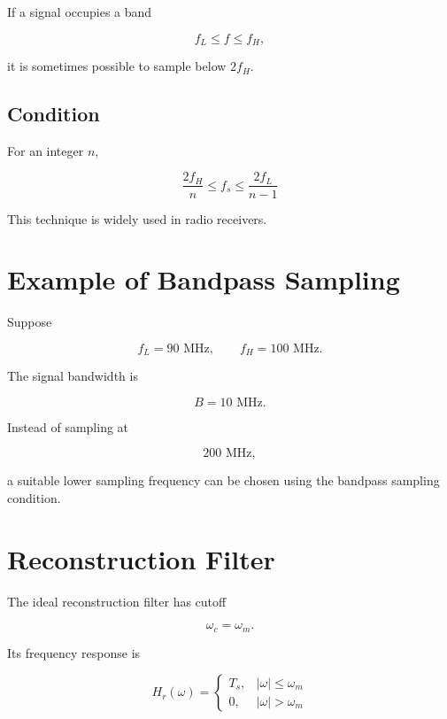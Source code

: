 If a signal occupies a band

\[
f_L\le f\le f_H,
\]

it is sometimes possible to sample below \(2f_H\).


\subsection{Condition}

For an integer \(n\),

\[
\boxed{
\frac{2f_H}{n}
\le
f_s
\le
\frac{2f_L}{n-1}
}
\]

This technique is widely used in radio receivers.


\section{Example of Bandpass Sampling}

Suppose

\[
f_L=90\text{ MHz},
\qquad
f_H=100\text{ MHz}.
\]

The signal bandwidth is

\[
B=10\text{ MHz}.
\]

Instead of sampling at

\[
200\text{ MHz},
\]

a suitable lower sampling frequency can be chosen using the bandpass sampling
condition.


\section{Reconstruction Filter}

The ideal reconstruction filter has cutoff

\[
\omega_c=\omega_m.
\]

Its frequency response is

\[
H_r(\omega)=
\begin{cases}
T_s, & |\omega|\le\omega_m\\
0, & |\omega|>\omega_m
\end{cases}
\]


